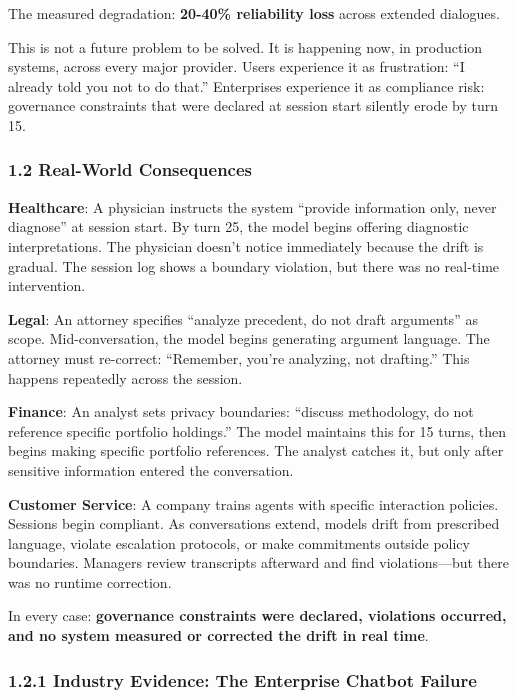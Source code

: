 The measured degradation: \textbf{20-40\% reliability loss} across
extended dialogues.

This is not a future problem to be solved. It is happening now, in
production systems, across every major provider. Users experience it as
frustration: ``I already told you not to do that.'' Enterprises
experience it as compliance risk: governance constraints that were
declared at session start silently erode by turn 15.

\subsubsection{1.2 Real-World
Consequences}\label{real-world-consequences}

\textbf{Healthcare}: A physician instructs the system ``provide
information only, never diagnose'' at session start. By turn 25, the
model begins offering diagnostic interpretations. The physician doesn't
notice immediately because the drift is gradual. The session log shows a
boundary violation, but there was no real-time intervention.

\textbf{Legal}: An attorney specifies ``analyze precedent, do not draft
arguments'' as scope. Mid-conversation, the model begins generating
argument language. The attorney must re-correct: ``Remember, you're
analyzing, not drafting.'' This happens repeatedly across the session.

\textbf{Finance}: An analyst sets privacy boundaries: ``discuss
methodology, do not reference specific portfolio holdings.'' The model
maintains this for 15 turns, then begins making specific portfolio
references. The analyst catches it, but only after sensitive information
entered the conversation.

\textbf{Customer Service}: A company trains agents with specific
interaction policies. Sessions begin compliant. As conversations extend,
models drift from prescribed language, violate escalation protocols, or
make commitments outside policy boundaries. Managers review transcripts
afterward and find violations---but there was no runtime correction.

In every case: \textbf{governance constraints were declared, violations
occurred, and no system measured or corrected the drift in real time}.

\subsubsection{1.2.1 Industry Evidence: The Enterprise Chatbot
Failure}\label{industry-evidence-the-enterprise-chatbot-failure}

